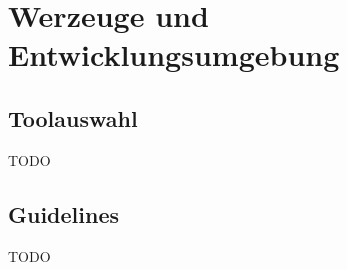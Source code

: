 \chapter{Werzeuge und Entwicklungsumgebung}
\label{cha:werzeuge_und_entwicklungsumgebung}

\section{Toolauswahl} 
\label{sec:toolauswahl}
TODO


\section{Guidelines} 
\label{sec:guidelines}
TODO

